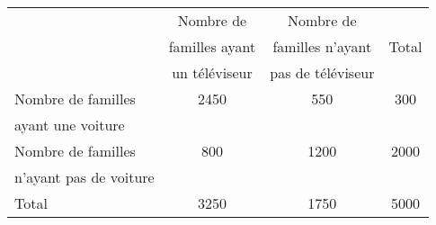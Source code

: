 \begin{tabular}{|@{\ }l@{\ }|@{\ }c@{\ }|@{\ }c@{\ }|@{$\qquad$ }c@{$\qquad$ }|}
	\hline
                       & Nombre de      & Nombre de         &       \\
                       & familles ayant & familles n'ayant  & Total \\
                       & un téléviseur  & pas de téléviseur &       \\ \hline
Nombre de familles     & \num{2450}     &   \num{550}       &   \num{300}    \\
ayant une voiture      &                &                   &       \\ \hline
Nombre de familles     &  \num{800}     &   \num{1200}      &   \num{2000}    \\
n'ayant pas de voiture &                &                   &       \\ \hline
Total                  &  \num{3250}    &   \num{1750}      & 5000  \\ \hline
\end{tabular}